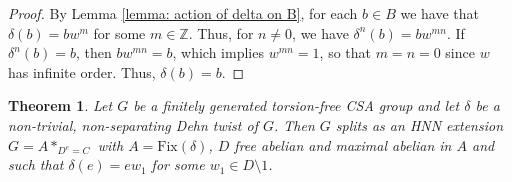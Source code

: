 \documentclass{amsart}
\newcommand{\Z}{\mathbb{Z}}
\theoremstyle{plain}
\newtheorem{thm}{Theorem}[section]
\theoremstyle{definition}
\theoremstyle{remark}
\begin{document}
\begin{proof}
    By Lemma \ref{lemma: action of delta on B}, for each $b \in B$ we have that $\delta(b) = bw^m$ for some $m \in \Z$. Thus, for $n \neq 0$, we have $\delta^n(b) = bw^{mn}$. If $\delta^n(b) = b$, then $bw^{mn} = b$, which implies $w^{mn} = 1$, so that $m=n=0$ since $w$ has infinite order. Thus, $\delta(b) = b$.
\end{proof}

\begin{thm}
    \label{thm: Enlarging the splitting}
    Let $G$ be a finitely generated torsion-free CSA group and let $\delta$ be a non-trivial, non-separating Dehn twist of $G$. Then $G$ splits as an HNN extension $G = A*_{D^e=C}$ with $A = \mathrm{Fix}(\delta)$, $D$ free abelian and maximal abelian in $A$ and such that $\delta(e) = ew_1$ for some $w_1 \in D \setminus 1$. 
\end{thm}
\end{document}

